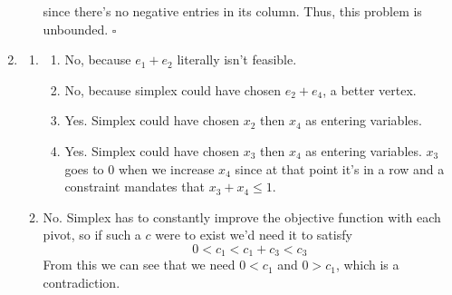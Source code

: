 \documentclass[12pt]{article}
\begin{document}
\begin{enumerate}
\begin{enumerate}
                        since there's no negative entries in its column.
                        Thus, this problem is unbounded. $\square$
            \end{enumerate}
      \item \begin{enumerate}
                  \item \begin{enumerate}
                              \item No, because $e_1+e_2$ literally isn't feasible.
                              \item No, because simplex could have chosen $e_2+e_4$,
                                    a better vertex.
                              \item Yes.
                                    Simplex could have chosen $x_2$ then $x_4$ as entering variables.
                              \item Yes.
                                    Simplex could have chosen $x_3$ then $x_4$ as entering variables.
                                    $x_3$ goes to $0$ when we increase $x_4$
                                    since at that point it's in a row and a constraint mandates that $x_3+x_4 \le 1$.
                        \end{enumerate}
                  \item No.
                        Simplex has to constantly improve the objective function with each pivot,
                        so if such a $c$ were to exist we'd need it to satisfy
                        \[0 < c_1 < c_1 + c_3 < c_3\]
                        From this we can see that we need $0<c_1$ and $0>c_1$, which is a contradiction.
            \end{enumerate}
\end{enumerate}
\end{document}
